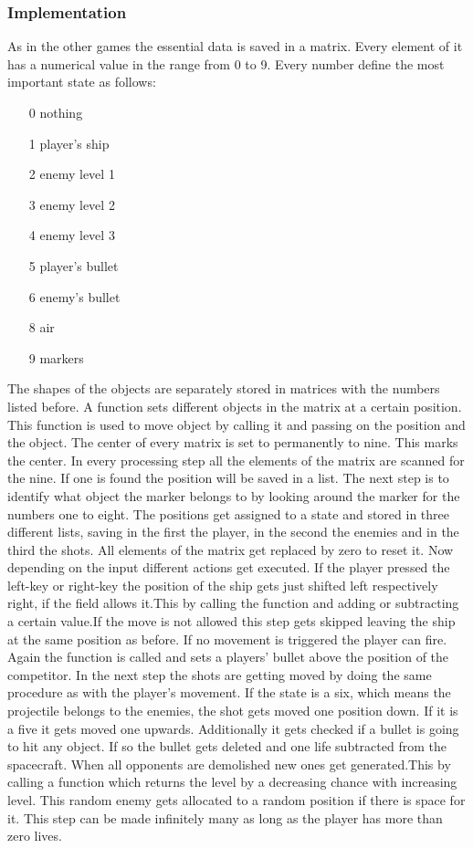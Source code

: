 \documentclass[12pt]{article}
\begin{document}
\subsubsection{Implementation}
As in the other games the essential data is saved in a matrix. Every element of it has a numerical value in the range from 0 to 9. Every number define the most important state as follows:
\begin{itemize}
\item[0] nothing
\item[1] player's ship
\item[2] enemy level 1
\item[3] enemy level 2
\item[4] enemy level 3
\item[5] player's bullet
\item[6] enemy's bullet
\item[8] air
\item[9] markers
\end{itemize}
The shapes of the objects are separately stored in matrices with the numbers listed before. A function sets different objects in the matrix at a certain position. This function is used to move object by calling it and passing on the position and the object. The center of every matrix is set to permanently to nine. This marks the center. In every processing step all the elements of the matrix are scanned for the nine. If one is found the position will be saved in a list. The next step is to identify what object the marker belongs to by looking around the marker for the numbers one to eight. The positions get assigned to a state and stored in three different lists, saving in the first the player, in the second the enemies and in the third the shots. All elements of the matrix get replaced by zero to reset it. Now depending on the input different actions get executed.
If the player pressed the left-key or right-key the position of the ship gets just shifted left respectively right, if the field allows it.This by calling the function and adding or subtracting a certain value.If the move is not allowed this step gets skipped leaving the ship at the same position as before. If no movement is triggered the player can fire. Again the function is called and sets a players' bullet above the position of the competitor.
In the next step the shots are getting moved by doing the same procedure as with the player's movement. If the state is a six, which means the projectile belongs to the enemies, the shot gets moved one position down. If it is a five it gets moved one upwards. Additionally it gets checked if a bullet is going to hit any object. If so the bullet gets deleted and one life subtracted from the spacecraft. When all opponents are demolished new ones get generated.This by calling a function which returns the level by a decreasing chance with increasing level. This random enemy gets allocated to a random position if there is space for it. This step can be made infinitely many as long as the player has more than zero lives.   
\end{document}
